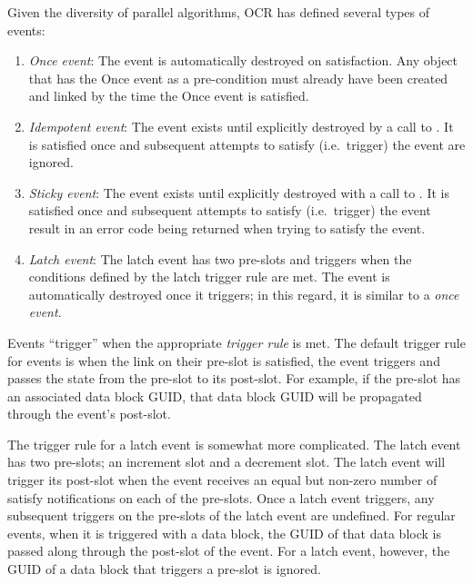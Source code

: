 Given the diversity of parallel algorithms, OCR has defined several
types of events:
\begin{enumerate}
\item \emph{Once event}: The event is automatically
destroyed on satisfaction. Any object that has the Once event as a
pre-condition must already have been created and linked by the time
the Once event is satisfied.

\item \emph{Idempotent event}: The event
exists until explicitly destroyed by a call to
. It is satisfied once and subsequent attempts
to satisfy (i.e.\ trigger) the event are ignored.

\item \emph{Sticky event}: The event exists until
explicitly destroyed with a call to . It is
satisfied once and subsequent attempts to satisfy (i.e.\ trigger) the
event result in an error code being returned when trying to satisfy
the event.
%
%
%
\item \emph{Latch event}: The latch event has two
pre-slots and triggers when the conditions defined by the latch
trigger rule are met. The event is automatically destroyed once it
triggers; in this regard, it is similar to a \emph{once event}.
\end{enumerate}

Events ``trigger'' when the appropriate \emph{trigger
rule} is met. The default trigger rule for events
is when the link on their pre-slot is satisfied, the event triggers
and passes the state from the pre-slot to its post-slot. For example,
if the pre-slot has an associated data block GUID, that data block
GUID will be propagated through the event's post-slot.

The trigger rule for a latch event is somewhat more complicated. The
latch event has two pre-slots; an increment slot and a decrement
slot. The latch event will trigger its post-slot when the event
receives an equal but non-zero number of satisfy notifications on each
of the pre-slots. Once a latch event triggers, any subsequent
triggers on the pre-slots of the latch event are undefined. For
regular events, when it is triggered with a data block, the GUID of
that data block is passed along through the post-slot of the
event. For a latch event, however, the GUID of a data block that
triggers a pre-slot is ignored.

